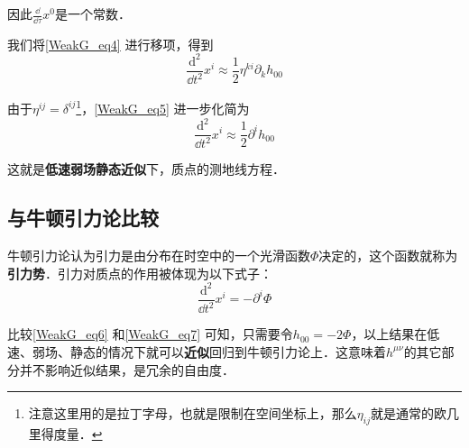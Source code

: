 因此$\frac{\dd}{\dd\tau}x^0$是一个常数．

我们将\autoref{WeakG_eq4} 进行移项，得到
\begin{equation}\label{WeakG_eq5}
\frac{\mathrm{d}^2}{\dd t^2}x^i\approx\frac{1}{2}\eta^{ki}\partial_kh_{00}
\end{equation}

由于$\eta^{ij}=\delta^{ij}$\footnote{注意这里用的是拉丁字母，也就是限制在空间坐标上，那么$\eta_{ij}$就是通常的欧几里得度量．}，\autoref{WeakG_eq5} 进一步化简为
\begin{equation}\label{WeakG_eq6}
\frac{\mathrm{d}^2}{\dd t^2}x^i\approx\frac{1}{2}\partial^ih_{00}
\end{equation}

这就是\textbf{低速弱场静态近似}下，质点的测地线方程．

\subsection{与牛顿引力论比较}

牛顿引力论认为引力是由分布在时空中的一个光滑函数$\Phi$决定的，这个函数就称为\textbf{引力势}．引力对质点的作用被体现为以下式子：
\begin{equation}\label{WeakG_eq7}
\frac{\mathrm{d}^2}{\dd t^2}x^i=-\partial^i\Phi
\end{equation}

比较\autoref{WeakG_eq6} 和\autoref{WeakG_eq7} 可知，只需要令$h_{00}=-2\Phi$，以上结果在低速、弱场、静态的情况下就可以\textbf{近似}回归到牛顿引力论上．这意味着$h^{\mu\nu}$的其它部分并不影响近似结果，是冗余的自由度．








